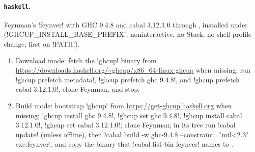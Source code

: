 {\paragraph{\texttt{haskell}.} Feynman's \code!feynver! with GHC 9.4.8 and cabal 3.12.1.0 through , installed under  (\code!GHCUP_INSTALL_BASE_PREFIX!; noninteractive, no Stack, no shell-profile change;  first on \code!PATH!).
\begin{enumerate}
\item Download mode: fetch the \code!ghcup! binary from \url{https://downloads.haskell.org/~ghcup/x86_64-linux-ghcup} when missing, run \code!ghcup prefetch metadata!, \code!ghcup prefetch ghc 9.4.8!, and \code!ghcup prefetch cabal 3.12.1.0!, clone Feynman, and stop.
\item Build mode: bootstrap \code!ghcup! from \url{https://get-ghcup.haskell.org} when missing; \code!ghcup install ghc 9.4.8!, \code!ghcup set ghc 9.4.8!, \code!ghcup install cabal 3.12.1.0!, \code!ghcup set cabal 3.12.1.0!; clone Feynman; in its tree run \code!cabal update! (unless offline), then \code!cabal build -w ghc-9.4.8 --constraint="mtl<2.3" exe:feynver!, and copy the binary that \code!cabal list-bin feynver! names to .
\end{enumerate}

}
